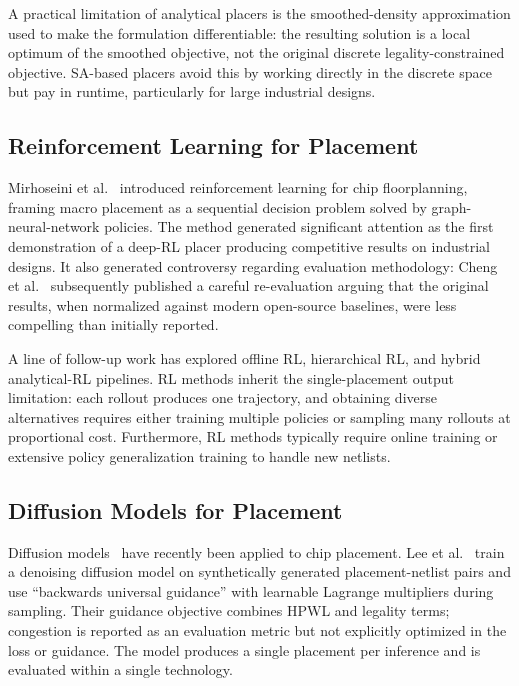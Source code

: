 \documentclass[lettersize,journal]{IEEEtran}
\begin{document}
A practical limitation of analytical placers is the smoothed-density approximation used to make the formulation differentiable: the resulting solution is a local optimum of the smoothed objective, not the original discrete legality-constrained objective. SA-based placers avoid this by working directly in the discrete space but pay in runtime, particularly for large industrial designs.

\subsection{Reinforcement Learning for Placement}

Mirhoseini et al.~\cite{mirhoseini2021nature} introduced reinforcement learning for chip floorplanning, framing macro placement as a sequential decision problem solved by graph-neural-network policies. The method generated significant attention as the first demonstration of a deep-RL placer producing competitive results on industrial designs. It also generated controversy regarding evaluation methodology: Cheng et al.~\cite{cheng2024rethinking} subsequently published a careful re-evaluation arguing that the original results, when normalized against modern open-source baselines, were less compelling than initially reported.

A line of follow-up work has explored offline RL, hierarchical RL, and hybrid analytical-RL pipelines. RL methods inherit the single-placement output limitation: each rollout produces one trajectory, and obtaining diverse alternatives requires either training multiple policies or sampling many rollouts at proportional cost. Furthermore, RL methods typically require online training or extensive policy generalization training to handle new netlists.

\subsection{Diffusion Models for Placement}

Diffusion models~\cite{sohl2015deep, ho2020ddpm} have recently been applied to chip placement. Lee et al.~\cite{lee2024chipdiffusion} train a denoising diffusion model on synthetically generated placement-netlist pairs and use ``backwards universal guidance'' with learnable Lagrange multipliers during sampling. Their guidance objective combines HPWL and legality terms; congestion is reported as an evaluation metric but not explicitly optimized in the loss or guidance. The model produces a single placement per inference and is evaluated within a single technology.
\end{document}
